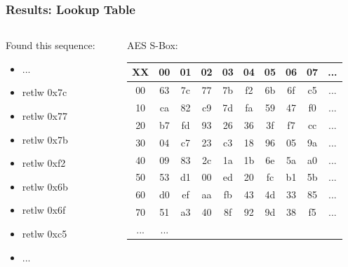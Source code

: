 \documentclass[aspectratio=169]{beamer}
\begin{document}
\begin{frame}
	\frametitle{Results: Lookup Table}

	\begin{columns}
		\begin{column}{0.4\textwidth}
			Found this sequence:

			\begin{itemize}
				\item ...
				\item retlw 0x7c
				\item retlw 0x77
				\item retlw 0x7b
				\item retlw 0xf2
				\item retlw 0x6b
				\item retlw 0x6f
				\item retlw 0xc5
				\item ...
			\end{itemize}
		\end{column}
		\begin{column}{0.6\textwidth}
			AES S-Box:

			\begin{tabular}{|c|ccccccccc|}
				\hline
				XX  & 00 & 01 & 02 & 03 & 04 & 05 & 06 & 07 & ...\\
				\hline
				\rowcolor[RGB]{42, 42, 42}
				00  & 63 & 7c & 77 & 7b & f2 & 6b & 6f & c5 & ...\\
				10  & ca & 82 & c9 & 7d & fa & 59 & 47 & f0 & ...\\
				20  & b7 & fd & 93 & 26 & 36 & 3f & f7 & cc & ...\\
				30  & 04 & c7 & 23 & c3 & 18 & 96 & 05 & 9a & ...\\
				40  & 09 & 83 & 2c & 1a & 1b & 6e & 5a & a0 & ...\\
				50  & 53 & d1 & 00 & ed & 20 & fc & b1 & 5b & ...\\
				60  & d0 & ef & aa & fb & 43 & 4d & 33 & 85 & ...\\
				70  & 51 & a3 & 40 & 8f & 92 & 9d & 38 & f5 & ...\\
				... & ... &   &    &    &    &    &    &    & \\
				\hline
			\end{tabular}
		\end{column}
	\end{columns}
\end{frame}
\end{document}
